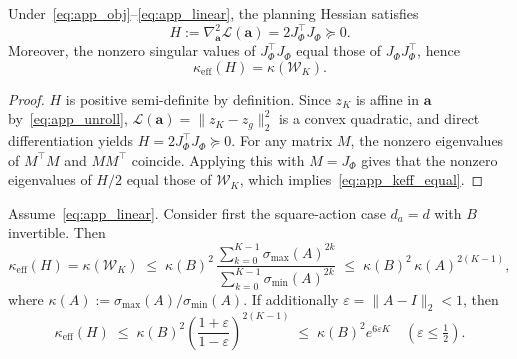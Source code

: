 \begin{lemma}\label{lem:app_hess_gram}
Under~\eqref{eq:app_obj}--\eqref{eq:app_linear}, the planning Hessian satisfies
\begin{equation}\label{eq:app_hess}
H:=\nabla^2_{\mathbf a}\mathcal L(\mathbf a)=2J_\Phi^\top J_\Phi\succeq 0.
\end{equation}
Moreover, the nonzero singular values of $J_\Phi^\top J_\Phi$ equal those of $J_\Phi J_\Phi^\top$,
hence
\begin{equation}\label{eq:app_keff_equal}
\kappa_{\mathrm{eff}}(H)=\kappa(\mathcal W_K).
\end{equation}
\end{lemma}

\begin{proof}
$H$ is positive semi-definite by definition. Since $z_K$ is affine in $\mathbf a$ by~\eqref{eq:app_unroll},
$\mathcal L(\mathbf a)=\|z_K-z_g\|_2^2$ is a convex quadratic, and direct differentiation yields
$H=2J_\Phi^\top J_\Phi\succeq 0$.
For any matrix $M$, the nonzero eigenvalues of $M^\top M$ and $MM^\top$ coincide.
Applying this with $M=J_\Phi$ gives that the nonzero eigenvalues of $H/2$ equal those of $\mathcal W_K$,
which implies~\eqref{eq:app_keff_equal}.
\end{proof}

\begin{theorem}\label{thm:app_cond}
Assume~\eqref{eq:app_linear}. Consider first the square-action case $d_a=d$ with $B$ invertible.
Then
\begin{equation}\label{eq:app_kappaA}
\kappa_{\mathrm{eff}}(H)=\kappa(\mathcal W_K)
\;\le\;
\kappa(B)^2\,
\frac{\sum_{k=0}^{K-1}\sigma_{\max}(A)^{2k}}{\sum_{k=0}^{K-1}\sigma_{\min}(A)^{2k}}
\;\le\;
\kappa(B)^2\,\kappa(A)^{2(K-1)},
\end{equation}
where $\kappa(A):=\sigma_{\max}(A)/\sigma_{\min}(A)$.
If additionally $\varepsilon=\|A-I\|_2<1$, then
\begin{equation}\label{eq:app_eps}
\kappa_{\mathrm{eff}}(H)
\;\le\;
\kappa(B)^2\left(\frac{1+\varepsilon}{1-\varepsilon}\right)^{2(K-1)}
\;\le\;
\kappa(B)^2 e^{6\varepsilon K}
\quad(\varepsilon\le\tfrac12).
\end{equation}
\end{theorem}


